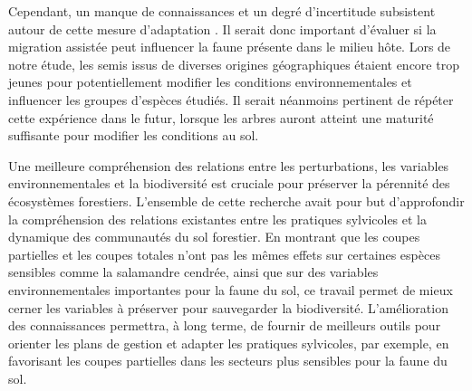 Cependant, un manque de connaissances et un degré d’incertitude subsistent autour de cette mesure d’adaptation \citep{Klenk2015assistedmigration,Park2018Informationunderload}. 
Il serait donc important d’évaluer si la migration assistée peut influencer la faune présente dans le milieu hôte.
Lors de notre étude, les semis issus de diverses origines géographiques étaient encore trop jeunes pour potentiellement modifier les conditions environnementales et influencer les groupes d’espèces étudiés. 
Il serait néanmoins pertinent de répéter cette expérience dans le futur, lorsque les arbres auront atteint une maturité suffisante pour modifier les conditions au sol. 

Une meilleure compréhension des relations entre les perturbations, les variables environnementales et la biodiversité est cruciale pour préserver la pérennité des écosystèmes forestiers. 
L’ensemble de cette recherche avait pour but d'approfondir la compréhension des relations existantes entre les pratiques sylvicoles et la dynamique des communautés du sol forestier. 
En montrant que les coupes partielles et les coupes totales n'ont pas les mêmes effets sur certaines espèces sensibles comme la salamandre cendrée, ainsi que sur des variables environnementales importantes pour la faune du sol, 
ce travail permet de mieux cerner les variables à préserver pour sauvegarder la biodiversité. 
L'amélioration des connaissances permettra, à long terme, de fournir de meilleurs outils pour orienter les plans de gestion et adapter les pratiques sylvicoles, 
par exemple, en favorisant les coupes partielles dans les secteurs plus sensibles pour la faune du sol. 


\cleardoublepage



